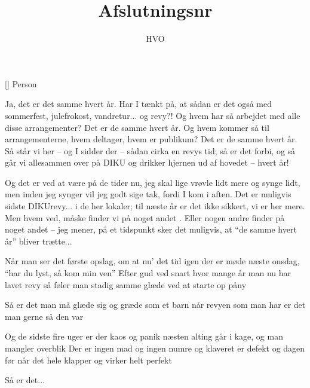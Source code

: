 \documentclass[a4paper,11pt]{article}
\title{Afslutningsnr}
\author{HVO}
\begin{document}
\maketitle

\begin{roles}
[] Person
\end{roles}

\begin{sketch}
     Ja, det er det samme hvert år. Har I tænkt på, at sådan er det også med sommerfest, julefrokost, vandretur... og revy?! Og hvem har så arbejdet med alle disse arrangementer? Det er de samme hvert år. Og hvem kommer så til arrangementerne, hvem deltager, hvem er publikum? Det er de samme hvert år. Så står vi her -- og I sidder der -- sådan cirka en revys tid; så er det forbi, og så går vi allesammen over på DIKU og drikker hjernen ud af hovedet -- hvert år!

     Og det er ved at være på de tider nu, jeg skal lige vrøvle lidt mere og synge lidt, men inden jeg synger vil jeg godt sige tak, fordi I kom i aften. Det er muligvis sidste DIKUrevy... i de her lokaler; til næste år er det ikke sikkert, vi er her mere. Men hvem ved, måske finder vi på noget andet . Eller nogen andre finder på noget andet -- jeg mener, på et tidspunkt sker det muligvis, at ``de samme hvert år'' bliver trætte...
\end{sketch}
\begin{song}
     Når man ser det første opslag, om at nu' det tid igen
              der er møde næste onsdag, ``har du lyst, så kom min ven''
              Efter gud ved snart hvor mange år
              man nu har lavet revy
              så føler man stadig samme glæde
              ved at starte op påny

     Så er det man må glæde sig og græde som et barn
              når revyen som man har
              er det man gerne så den var

     Og de sidste fire uger er der kaos og panik
              næsten alting går i kage, og man mangler overblik
              Der er ingen mad og ingen numre
              og klaveret er defekt
              og dagen før når det hele klapper
              og virker helt perfekt

     Så er det... 
\end{song}
\end{document}
